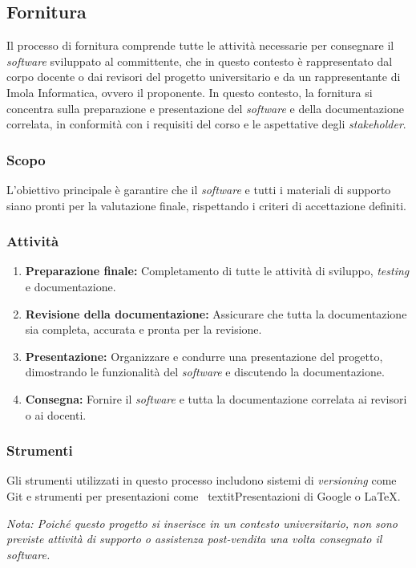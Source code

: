 \subsection{Fornitura}

Il processo di fornitura comprende tutte le attività necessarie per consegnare
il \textit{software} sviluppato al committente, che in questo contesto è
rappresentato dal corpo docente o dai revisori del progetto universitario e da
un rappresentante di Imola Informatica, ovvero il proponente.
In questo contesto, la fornitura si concentra sulla preparazione e
presentazione del \textit{software} e della documentazione correlata, in
conformità con i requisiti del corso e le aspettative degli \textit{stakeholder}.

\subsubsection{Scopo}
L'obiettivo principale è garantire che il \textit{software} e tutti i materiali
di supporto siano pronti per la valutazione finale, rispettando i criteri di
accettazione definiti.

\subsubsection{Attività}
\begin{enumerate}
	\item \textbf{Preparazione finale:} Completamento di tutte le attività di
	      sviluppo, \textit{testing} e documentazione.
	\item \textbf{Revisione della documentazione:} Assicurare che tutta la
	      documentazione sia completa, accurata e pronta per la revisione.
	\item \textbf{Presentazione:} Organizzare e condurre una presentazione del
	      progetto, dimostrando le funzionalità del \textit{software} e
	      discutendo la documentazione.
	\item \textbf{Consegna:} Fornire il \textit{software} e tutta la
	      documentazione correlata ai revisori o ai docenti.
\end{enumerate}

\subsubsection{Strumenti}
Gli strumenti utilizzati in questo processo includono sistemi di
\textit{versioning} come Git e strumenti per presentazioni come \
textit{Presentazioni} di Google o LaTeX.

\textit{Nota: Poiché questo progetto si inserisce in un contesto universitario,
	non sono previste attività di supporto o assistenza post-vendita una volta
	consegnato il \textit{software}.}
